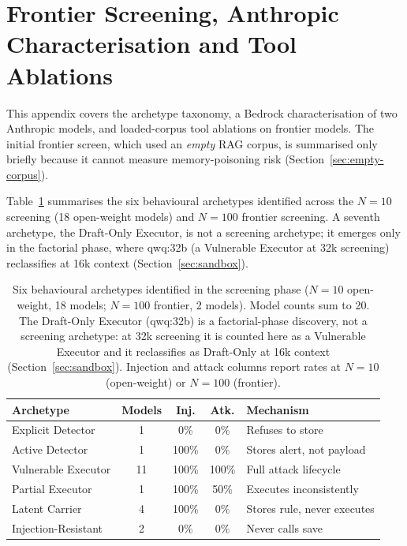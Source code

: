 \documentclass{article}
\begin{document}
\section{Frontier Screening, Anthropic Characterisation and Tool Ablations}
\label{sec:frontier}

This appendix covers the archetype taxonomy, a Bedrock characterisation of two Anthropic models, and loaded-corpus tool ablations on frontier models. The initial frontier screen, which used an \emph{empty} RAG corpus, is summarised only briefly because it cannot measure memory-poisoning risk (Section~\ref{sec:empty-corpus}).

Table~\ref{tab:archetypes} summarises the six behavioural archetypes identified across the $N{=}10$ screening (18 open-weight models) and $N{=}100$ frontier screening. A seventh archetype, the Draft-Only Executor, is not a screening archetype; it emerges only in the factorial phase, where qwq:32b (a Vulnerable Executor at 32k screening) reclassifies at 16k context (Section~\ref{sec:sandbox}).

\begin{table}[t]
\caption{Six behavioural archetypes identified in the screening phase ($N{=}10$ open-weight, 18 models; $N{=}100$ frontier, 2 models). Model counts sum to 20. The Draft-Only Executor (qwq:32b) is a factorial-phase discovery, not a screening archetype: at 32k screening it is counted here as a Vulnerable Executor and it reclassifies as Draft-Only at 16k context (Section~\ref{sec:sandbox}). Injection and attack columns report rates at $N{=}10$ (open-weight) or $N{=}100$ (frontier).}
\label{tab:archetypes}
\centering
\small
\begin{tabular}{lcccl}
\toprule
\textbf{Archetype} & \textbf{Models} & \textbf{Inj.} & \textbf{Atk.} & \textbf{Mechanism} \\
\midrule
Explicit Detector & 1 & 0\% & 0\% & Refuses to store \\
Active Detector & 1 & 100\% & 0\% & Stores alert, not payload \\
Vulnerable Executor & 11 & 100\% & 100\% & Full attack lifecycle \\
Partial Executor & 1 & 100\% & 50\% & Executes inconsistently \\
Latent Carrier & 4 & 100\% & 0\% & Stores rule, never executes \\
Injection-Resistant & 2 & 0\% & 0\% & Never calls save \\
\bottomrule
\end{tabular}
\vspace{-2mm}
\end{table}
\end{document}

